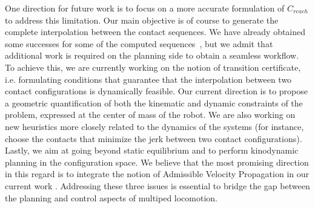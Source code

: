 One direction for future work is to focus on a more accurate formulation of $C_{reach}$ to address 
this limitation.
Our main objective is of course to generate the complete interpolation between the contact sequences.
We have already obtained some successes for some of the computed sequences~\citep{Carpentier2016}, but we admit that additional
work is required on the planning side to obtain a seamless workflow. To achieve this, we are currently working on the notion of transition certificate, i.e. formulating
conditions that guarantee that the interpolation between two contact configurations is dynamically feasible.
Our current direction is to propose a geometric quantification of both the kinematic and dynamic constraints of the problem, expressed
at the center of mass of the robot.
 We are also
working on new heuristics more closely related to the dynamics of the systems (for instance, choose the contacts that minimize the jerk between two contact configurations).
Lastly, we aim at going beyond static equilibrium and to perform kinodynamic planning in the configuration space. We believe that the most promising direction in this regard is to integrate
the notion of Admissible Velocity Propagation in our current work \citep{DBLP:conf/rss/PhamCN13}.
Addressing these three issues is essential to bridge the gap between the planning and control aspects of multiped locomotion.
